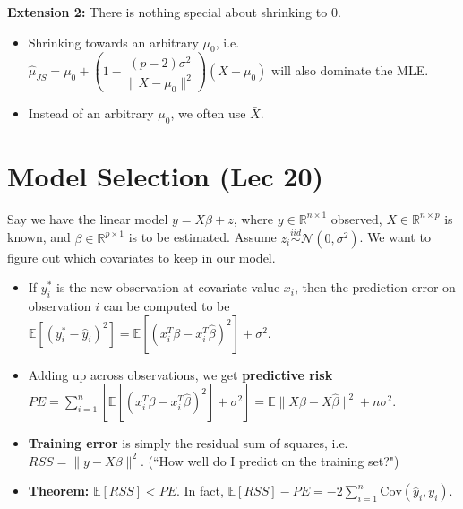 \documentclass[twoside]{article}
\newcommand\dis{\displaystyle}
\newcommand\bbE{\mathbb{E}}
\newcommand\bbR{\mathbb{R}}
\newcommand\calN{\mathcal{N}}
\newcommand\sg{\sigma}
\begin{document}
\textbf{Extension 2:} There is nothing special about shrinking to $0$.
\begin{itemize}
\item Shrinking towards an arbitrary $\mu_0$, i.e. $\hat{\mu}_{JS} = \mu_0 + \left(1 - \dfrac{(p-2)\sg^2}{\|X - \mu_0\|^2}\right)(X-\mu_0)$ will also dominate the MLE.

\item Instead of an arbitrary $\mu_0$, we often use $\bar{X}$.
\end{itemize}

\section{Model Selection (Lec 20)}
Say we have the linear model $y = X\beta + z$, where $y \in \bbR^{n \times 1}$ observed, $X \in \bbR^{n \times p}$ is known, and $\beta \in \bbR^{p \times 1}$ is to be estimated. Assume $z_i \stackrel{iid}{\sim} \calN(0, \sg^2)$. We want to figure out which covariates to keep in our model.

\begin{itemize}
\item If $y_i^*$ is the new observation at covariate value $x_i$, then the prediction error on observation $i$ can be computed to be $\bbE [(y_i^* - \hat{y}_i)^2] = \bbE \left[ \left(x_i^T \beta - x_i^T \hat{\beta} \right)^2 \right] + \sg^2$.

\item Adding up across observations, we get \textbf{predictive risk} $PE = \dis\sum_{i=1}^n \left[ \bbE \left[ \left(x_i^T \beta - x_i^T \hat{\beta} \right)^2 \right] + \sg^2 \right] = \bbE \|X\beta - X\hat{\beta}\|^2 + n\sg^2$.

\item \textbf{Training error} is simply the residual sum of squares, i.e. $RSS = \|y - X\beta \|^2$. (``How well do I predict on the training set?")

\item \textbf{Theorem:} $\bbE [RSS] < PE$. In fact, $\bbE [RSS] - PE = - 2 \dis\sum_{i=1}^n \text{Cov}(\hat{y}_i, y_i)$.
\end{itemize}
\end{document}
